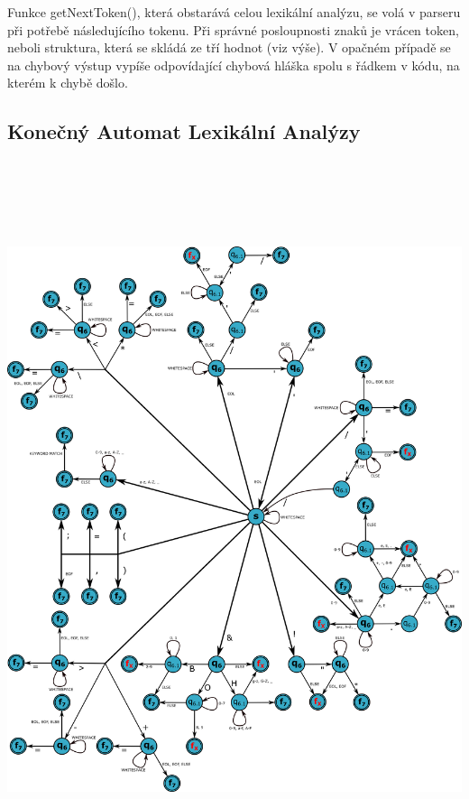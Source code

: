 \documentclass[11pt,a4paper]{article}
\begin{document}
	Funkce getNextToken(), která obstarává celou lexikální analýzu, se volá v parseru při potřebě následujícího tokenu. Při správné posloupnosti znaků je vrácen token, neboli struktura, která se skládá ze tří hodnot (viz výše). V opačném případě se na chybový výstup vypíše odpovídající chybová hláška spolu s řádkem v kódu, na kterém k chybě došlo.
    \newpage

\subsection{Konečný Automat Lexikální Analýzy}
\vspace{1cm}
	\centerline{\includegraphics[height=21cm]{KA.png}}
    {\newpage}
\end{document}
